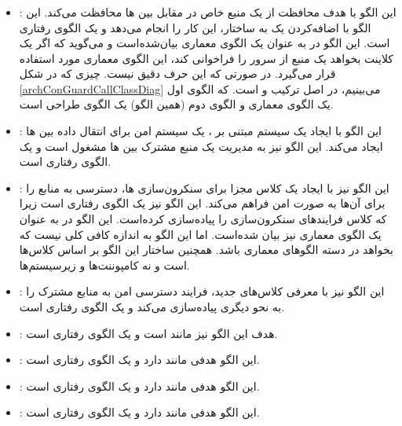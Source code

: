 \subsubsection{}
\begin{itemize}
\item {}: %
این الگو با هدف محافظت از یک منبع خاص در مقابل  بین
ها محافظت می‌کند. این الگو با اضافه‌کردن یک 
به ساختار، این کار را انجام می‌دهد و یک الگوی رفتاری است.
این الگو در \cite{ref4} به عنوان یک الگوی معماری بیان‌شده‌است
و می‌گوید که اگر یک کلاینت بخواهد یک منبع از سرور را فراخوانی کند،
این الگوی معماری مورد استفاده قرار می‌گیرد. در صورتی که این حرف دقیق
نیست. چیزی که در شکل \ref{archConGuardCallClassDiag}
می‌بینیم، در اصل ترکیب 
و  است.
که الگوی اول یک الگوی معماری و الگوی دوم (همین الگو) یک الگوی
طراحی است.
\item {}: %
این الگو با ایجاد یک سیستم مبتنی بر ، یک
سیستم امن برای انتقال داده بین ها ایجاد
می‌کند. این الگو نیز به مدیریت یک منبع مشترک بین ها
مشغول است و یک الگوی رفتاری است.
\item {}: %
این الگو نیز با ایجاد یک کلاس مجزا برای سنکرون‌سازی ها،
دسترسی به منابع را برای آن‌ها به صورت امن فراهم می‌کند. این الگو نیز
یک الگوی رفتاری است زیرا که کلاس  فرایندهای
سنکرون‌سازی را پیاده‌سازی کرده‌است. این الگو در \cite{ref4} به عنوان
یک الگوی معماری نیز بیان شده‌است. اما این الگو به اندازه کافی
کلی نیست که بخواهد در دسته الگوهای معماری باشد. همچنین ساختار
این الگو بر اساس کلاس‌ها است و نه کامپوننت‌ها و زیرسیستم‌ها.
\item {}: %
این الگو نیز با معرفی کلاس‌های جدید، فرایند دسترسی امن به منابع مشترک
را به نحو دیگری پیاده‌سازی می‌کند و یک الگوی رفتاری است.
\item {}: %
هدف این الگو نیز مانند 
است و یک الگوی رفتاری است.
\item {}: %
این الگو هدفی مانند 
دارد و یک الگوی رفتاری است.
\item {}: %
این الگو هدفی مانند 
دارد و یک الگوی رفتاری است.
\item {}: %
این الگو هدفی مانند 
دارد و یک الگوی رفتاری است.
\end{itemize}


